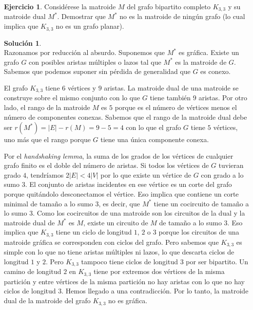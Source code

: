 \documentclass[10pt]{article}
\theoremstyle{definition}
\newtheorem{ejer}{Ejercicio}
\newtheorem*{sol}{Solución}
\begin{document}
\begin{ejer} Considérese la matroide $M$ del grafo bipartito completo $K_{3,3}$ y su matroide dual $M^*$. Demostrar que $M^*$ no es la matroide de ningún grafo (lo cual implica que $K_{3,3}$ no es un grafo planar).
\end{ejer}
\begin{sol}\phantom{}\\
Razonamos por reducción al absurdo. Suponemos que $M^*$ es gráfica. Existe un grafo $G$ con posibles aristas múltiples o lazos tal que $M^*$ es la matroide de $G$. Sabemos que podemos suponer sin pérdida de generalidad que $G$ es conexo.

El grafo $K_{3,3}$ tiene $6$ vértices y $9$ aristas. La matroide dual de una matroide se construye sobre el mismo conjunto con lo que $G$ tiene también $9$ aristas. Por otro lado, el rango de la matroide $M$ es $5$ porque es el número de vértices menos el número de componentes conexas. Sabemos que el rango de la matroide dual debe ser $r(M^*)=|E|-r(M)=9-5=4$ con lo que el grafo $G$ tiene $5$ vértices, uno más que el rango porque $G$ tiene una única componente conexa.

Por el \textit{handshaking lemma}, la suma de los grados de los vértices de cualquier  grafo finito es el doble del número de aristas. Si todos los vértices de $G$ tuvieran grado $4$, tendríamos $2|E|<4|V|$ por lo que existe un vértice de $G$ con grado a lo sumo $3$. El conjunto de aristas incidentes en ese vértice es un corte del grafo porque quitándolo desconectamos el vértice. Eso implica que contiene un corte minimal de tamaño a lo sumo $3$, es decir, que $M^*$ tiene un cocircuito de tamaño a lo sumo $3$. Como los cocircuitos de una matroide son los circuitos de la dual y la matroide dual de $M^*$ es $M$, existe un circuito de $M$ de tamaño a lo sumo $3$. Eso implica que $K_{3,3}$ tiene un ciclo de longitud $1$, $2$ o $3$ porque los circuitos de una matroide gráfica se corresponden con ciclos del grafo. Pero sabemos que $K_{3,3}$ es simple con lo que no tiene aristas múltiples ni lazos, lo que descarta ciclos de longitud $1$ y $2$. Pero $K_{3,3}$ tampoco tiene ciclos de longitud $3$ por ser bipartito. Un camino de longitud $2$ en $K_{3,3}$ tiene por extremos dos vértices de la misma partición y entre vértices de la misma partición no hay aristas con lo que no hay ciclos de longitud $3$. Hemos llegado a una contradicción. Por lo tanto, la matroide dual de la matroide del grafo $K_{3,3}$ no es gráfica.

\end{sol}
\end{document}
